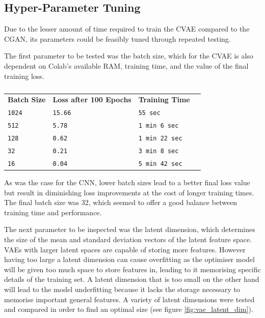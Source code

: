 \documentclass{l4proj}
\begin{document}
\subsection{Hyper-Parameter Tuning}
Due to the lesser amount of time required to train the CVAE compared to the CGAN, its parameters could be feasibly tuned through repeated testing. 

The first parameter to be tested was the batch size, which for the CVAE is also dependent on Colab's available RAM, training time, and the value of the final training loss.
\begin{table}[H]
    \centering
    \caption{}
    \label{tab:operators}
    \begin{tabular}{llll}
        \textbf{Batch Size} &   \textbf{Loss after 100 Epochs}       &   \textbf{Training Time} \\   
        \texttt{1024}           &   \texttt{15.66}                   &   \texttt{55 sec}        \\
        \texttt{512}            &   \texttt{5.78}                    &   \texttt{1 min 6 sec}   \\
        \texttt{128}            &   \texttt{0.62}                   &   \texttt{1 min 22 sec}   \\
        \texttt{32}             &   \texttt{0.21}                   &   \texttt{3 min 8 sec}    \\
        \texttt{16}             &   \texttt{0.04}                   &   \texttt{5 min 42 sec}   \\
    \end{tabular}
\end{table}

As was the case for the CNN, lower batch sizes lead to a better final loss value but result in diminishing loss improvements at the cost of longer training times. The final batch size was 32, which seemed to offer a good balance between training time and performance.

The next parameter to be inspected was the latent dimension, which determines the size of the mean and standard deviation vectors of the latent feature space. VAEs with larger latent spaces are capable of storing more features. However having too large a latent dimension can cause overfitting as the optimiser model will be given too much space to store features in, leading to it memorising specific details of the training set. A latent dimension that is too small on the other hand will lead to the model underfitting because it lacks the storage necessary to memorise important general features. A variety of latent dimensions were tested  and compared in order to find an optimal size (see figure \ref{fig:vae_latent_dim}).
\end{document}
